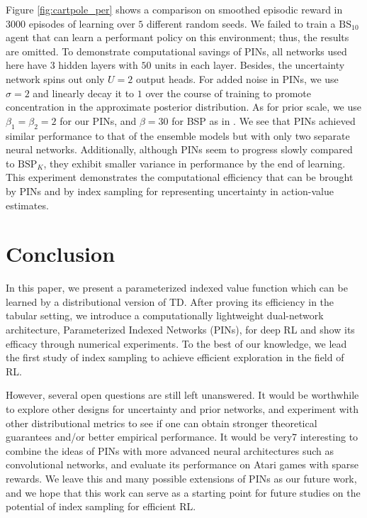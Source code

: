 \documentclass[letterpaper]{article} %
\theoremstyle{definition}
\begin{document}
Figure \ref{fig:cartpole_per} shows a comparison on smoothed episodic reward in $3000$ episodes of learning over $5$ different random seeds. We failed to train a $\mathrm{BS}_{10}$ agent that can learn a performant policy on this environment; thus, the results are omitted. To demonstrate computational savings of PINs, all networks used here have $3$ hidden layers with $50$ units in each layer. Besides, the uncertainty network spins out only $U=2$ output heads. For added noise in PINs, we use $\sigma=2$ and linearly decay it to $1$ over the course of training to promote concentration in the approximate posterior distribution. As for prior scale, we use $\beta_1=\beta_2=2$ for our PINs, and $\beta=30$ for BSP as in \cite{osband2018randomized}. We see that PINs achieved similar performance to that of the ensemble models but with only two separate neural networks. Additionally, although PINs seem to progress slowly compared to $\mathrm{BSP}_K$, they exhibit smaller variance in performance by the end of learning. This experiment demonstrates the computational efficiency that can be brought by PINs and by index sampling for representing uncertainty in action-value estimates.

\section{Conclusion}

In this paper, we present a parameterized indexed value function which can be learned by a distributional version of TD. After proving its efficiency in the tabular setting, we introduce a computationally lightweight dual-network architecture, Parameterized Indexed Networks (PINs), for deep RL and show its efficacy through numerical experiments. To the best of our knowledge, we lead the first study of index sampling to achieve efficient exploration in the field of RL.

However, several open questions are still left unanswered. It would be worthwhile to explore other designs for uncertainty and prior networks, and experiment with other distributional metrics to see if one can obtain stronger theoretical guarantees and/or better empirical performance. It would be very7 interesting to combine the ideas of PINs with more advanced neural architectures such as convolutional networks, and evaluate its performance on Atari games with sparse rewards. We leave this and many possible extensions of PINs as our future work, and we hope that this work can serve as a starting point for future studies on the potential of index sampling for efficient RL.
\end{document}
